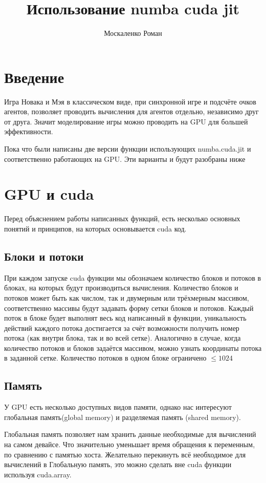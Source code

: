 \documentclass[a4paper,12pt]{article}
\title{Использование numba cuda jit}
\author{Москаленко Роман}
\date{}
\begin{document}
\maketitle

\section{Введение}
Игра Новака и Мэя в классическом виде, при синхронной игре и подсчёте очков агентов, позволяет проводить вычисления для агентов отдельно, независимо друг от друга. Значит моделирование игры можно проводить на GPU для большей эффективности. 

Пока что были написаны две версии функции использующих numba.cuda.jit и соответственно работающих на GPU. Эти варианты и будут разобраны ниже

\section{GPU и cuda}

Перед объяснением работы написанных функций, есть несколько основных понятий и принципов, на которых основывается cuda код.

\subsection{Блоки и потоки}

При каждом запуске cuda функции мы обозначаем количество блоков и потоков в блоках, на которых будут производиться вычисления.  Количество блоков и потоков может быть как числом, так и двумерным или трёхмерным массивом, соответственно массивы будут задавать форму сетки блоков и потоков. Каждый поток в блоке будет выполнят весь код написанный в функции, уникальность действий каждого потока достигается за счёт возможности получить номер потока (как внутри блока, так и во всей сетке). Аналогично в случае, когда количество потоков и блоков задаётся массивом, можно узнать координаты потока в заданной сетке. Количество потоков в одном блоке ограничено $\le 1024$

\subsection{Память}

У GPU есть несколько доступных видов памяти, однако нас интересуют глобальная память(global memory) и разделяемая память (shared memory).

Глобальная память позволяет нам хранить данные необходимые для вычислений на самом девайсе. Что значительно уменьшает время обращения к переменным, по сравнению с памятью хоста. Желательно перекинуть всё необходимое для вычислений в Глобальную память, это можно сделать вне cuda функции используя cuda.array.
\end{document}
